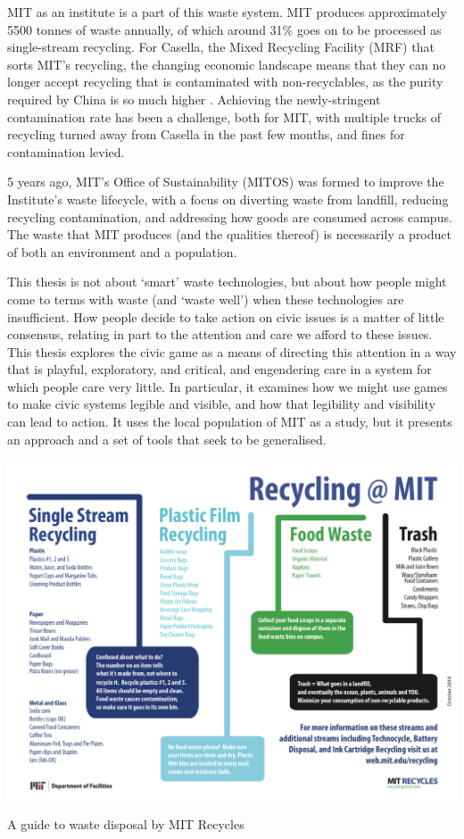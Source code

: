 \documentclass[nofonts,nols,justified,nobib]{tufte-book}
\begin{document}
MIT as an institute is a part of this waste system. MIT produces approximately 5500 tonnes of waste annually, of which around 31\% goes on to be processed as single-stream recycling. For Casella, the Mixed Recycling Facility (MRF) that sorts MIT's recycling, the changing economic landscape means that they can no longer accept recycling that is contaminated with non-recyclables, as the purity required by China is so much higher \cite{casella_2018_2018}. Achieving the newly-stringent contamination rate has been a challenge, both for MIT, with multiple trucks of recycling turned away from Casella in the past few months, and fines for contamination levied.

5 years ago, MIT's Office of Sustainability (MITOS) was formed to improve the Institute's waste lifecycle, with a focus on diverting waste from landfill, reducing recycling contamination, and addressing how goods are consumed across campus. The waste that MIT produces (and the qualities thereof) is necessarily a product of both an environment and a population.


This thesis is not about `smart' waste technologies, but about how people might come to terms with waste (and `waste well') when these technologies are insufficient. How people decide to take action on civic issues is a matter of little consensus, relating in part to the attention and care we afford to these issues. This thesis explores the civic game as a means of directing this attention in a way that is playful, exploratory, and critical, and engendering care in a system for which people care very little. In particular, it examines how we might use games to make civic systems legible and visible, and how that legibility and visibility can lead to action. It uses the local population of MIT as a study, but it presents an approach and a set of tools that seek to be generalised.


\begin{marginfigure}
\includegraphics[width=\textwidth]{img/1/flowchart.png}
\caption{A guide to waste disposal by MIT Recycles}
\end{marginfigure}
\end{document}
